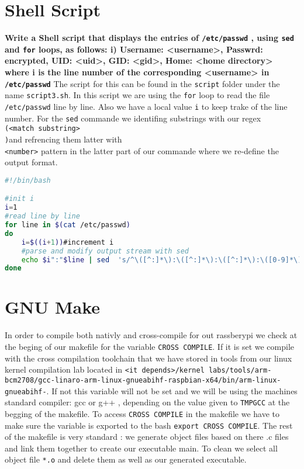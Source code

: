 \documentclass[a4paper,oneside,onecolumn]{article}
\newcommand{\code}[1]{\colorbox{codegray}{\texttt{#1}}}
\begin{document}
\section*{Shell Script}
\noindent
\textbf{Write a Shell script that displays the entries of
\texttt{/etc/passwd}
, using
\code{sed}
and
\code{for}
loops, as follows:
\newline
i) Username:  <username>, Passwrd:  encrypted, UID: <uid>, GID: <gid>, Home:  <home
directory>
\newline
where i
is the line number of the corresponding
<username>
in
\texttt{
/etc/passwd}
}
\newline
\newline
The script for this can be found in the \texttt{script} folder under the name \texttt{script3.sh}.
\newline
In this script we are using the \code{for} loop to read the file \texttt{/etc/passwd} line by line. Also we have a local value 
\code{i} to keep trake of the line number.  For the \code{sed} commande we identifing substrings with our regex \code{\\(<match substring>\\)}and refrencing them latter with \code{\\<number>} pattern
in the latter part of our commande where we re-define the output format.
\begin{lstlisting}[language=bash,caption={bash version}]
#!/bin/bash

#init i
i=1
#read line by line
for line in $(cat /etc/passwd)
do
    i=$((i+1))#increment i
    #parse and modify output stream with sed
    echo $i":"$line | sed  's/^\([^:]*\):\([^:]*\):\([^:]*\):\([0-9]*\):\([0-9]*\)::\([^:]*\).*/\1) Username: \2 ,Password: encrypted, UID: \4, GID: \5, Home: \6/'
done
\end{lstlisting}

\noindent
\section*{GNU Make}
In order to compile both nativly and cross-compile for out rassberypi we check at the beging of our makefile for the variable \code{CROSS COMPILE}. If it is set we compile with the cross compilation toolchain that we have stored in tools from our linux kernel compilation lab located in \texttt{<it depends>/kernel labs/tools/arm-bcm2708/gcc-linaro-arm-linux-gnueabihf-raspbian-x64/bin/arm-linux-gnueabihf-}. If not this variable will not be set and we will be using the machines standard compiler: gcc or g++ , depending on the value given to \code{TMPGCC} at the begging of the makefile.\newline
To access \code{CROSS COMPILE} in the makefile we have to make sure the variable is exported to the bash \code{export CROSS COMPILE}.
\newline
The rest of the makefile is very standard : we generate object files based on there .c files and link them together to create our executable main. To clean we select all object file \code{*.o} and delete them as well as our generated executable.
\end{document}
